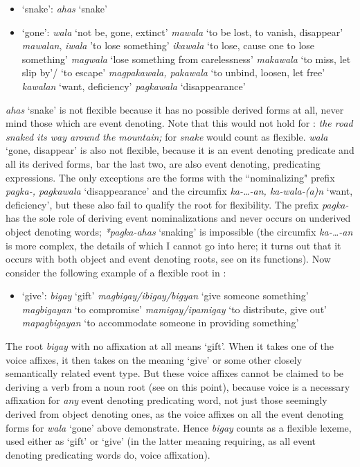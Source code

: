 \documentclass[output=paper]{langsci/langscibook}
\begin{document}
\begin{itemize}
\item `snake’: \textit{ahas} `snake' 
\item ‘gone’: \textit{wala} `not be, gone, extinct' \textit{mawala} `to be lost, to vanish, disappear' \textit{mawalan}, \textit{iwala} 'to lose something' \textit{ikawala} `to lose, cause one to lose something' \textit{magwala} `lose something from carelessness' \textit{makawala} `to miss, let slip by'/ `to escape' \textit{magpakawala, pakawala} `to unbind, loosen, let free' \textit{kawalan} `want, deficiency' \textit{pagkawala} `disappearance' 
\end{itemize}

\textit{ahas} ‘snake’ is not flexible because it has no possible derived forms at all, never mind those which are event denoting. Note that this would not hold for : \textit{the road snaked its way around the mountain;} for  \textit{snake} would count as flexible. \textit{wala} ‘gone, disappear’ is also not flexible, because it is an event denoting predicate and all its derived forms, bar the last two, are also event denoting, predicating expressions. The only exceptions are the forms with the ``nominalizing" prefix \textit{pagka-, pagkawala} ‘disappearance’ and the circumfix \textit{ka-…-an, ka-wala-(a)n} ‘want, deficiency’, but these also fail to qualify the root for flexibility.  The prefix \textit{pagka-} has the sole role of deriving event nominalizations and never occurs on underived object denoting words; \textit{*pagka-ahas} ‘snaking’ is impossible (the circumfix \textit{ka-…-an} is more complex, the details of which I cannot go into here; it turns out that it occurs with both object and event denoting roots, see \citealt{SchachterEtAl1972} on its functions). Now consider the following example of a flexible root in :

\begin{itemize}
\item ‘give’: \textit{bigay} `gift' \textit{magbigay/ibigay/bigyan} `give someone something' \textit{magbigayan} `to compromise' \textit{mamigay/ipamigay} `to distribute, give out' \textit{mapagbigayan} `to accommodate someone in providing something'
\end{itemize}

The root \textit{bigay} with no affixation at all means ‘gift’. When it takes one of the voice affixes, it then takes on the meaning ‘give’ or some other closely semantically related event type. But these voice affixes cannot be claimed to be deriving a verb from a noun root (see \citeauthor{Foley2008}  on this point), because voice is a necessary affixation for \textit{any} event denoting predicating word, not just those seemingly derived from object denoting ones, as the voice affixes on all the event denoting forms for \textit{wala} ‘gone’ above demonstrate. Hence \textit{bigay} counts as a flexible lexeme, used either as ‘gift’ or ‘give’ (in the latter meaning requiring, as all event denoting predicating words do, voice affixation).
\end{document}
